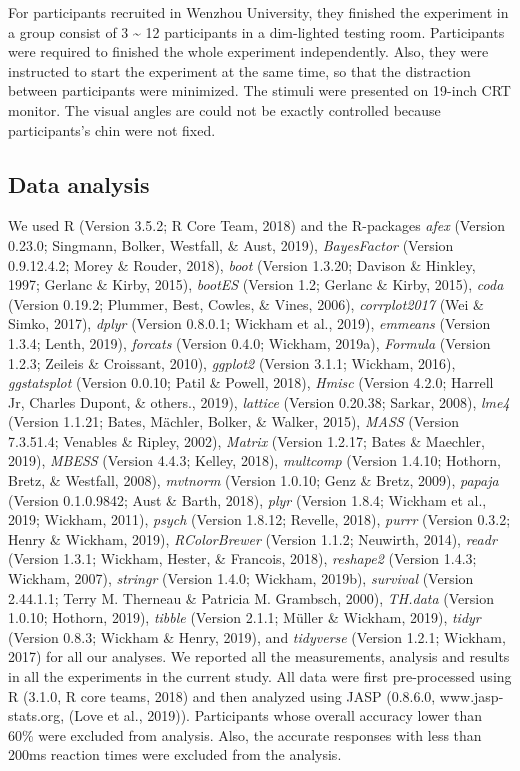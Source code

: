 \documentclass[man]{apa6}
\begin{document}
For participants recruited in Wenzhou University, they finished the experiment in a group consist of 3 \textasciitilde{} 12 participants in a dim-lighted testing room. Participants were required to finished the whole experiment independently. Also, they were instructed to start the experiment at the same time, so that the distraction between participants were minimized. The stimuli were presented on 19-inch CRT monitor. The visual angles are could not be exactly controlled because participants's chin were not fixed.

\hypertarget{data-analysis}{%
\subsection{Data analysis}\label{data-analysis}}

We used R (Version 3.5.2; R Core Team, 2018) and the R-packages \emph{afex} (Version 0.23.0; Singmann, Bolker, Westfall, \& Aust, 2019), \emph{BayesFactor} (Version 0.9.12.4.2; Morey \& Rouder, 2018), \emph{boot} (Version 1.3.20; Davison \& Hinkley, 1997; Gerlanc \& Kirby, 2015), \emph{bootES} (Version 1.2; Gerlanc \& Kirby, 2015), \emph{coda} (Version 0.19.2; Plummer, Best, Cowles, \& Vines, 2006), \emph{corrplot2017} (Wei \& Simko, 2017), \emph{dplyr} (Version 0.8.0.1; Wickham et al., 2019), \emph{emmeans} (Version 1.3.4; Lenth, 2019), \emph{forcats} (Version 0.4.0; Wickham, 2019a), \emph{Formula} (Version 1.2.3; Zeileis \& Croissant, 2010), \emph{ggplot2} (Version 3.1.1; Wickham, 2016), \emph{ggstatsplot} (Version 0.0.10; Patil \& Powell, 2018), \emph{Hmisc} (Version 4.2.0; Harrell Jr, Charles Dupont, \& others., 2019), \emph{lattice} (Version 0.20.38; Sarkar, 2008), \emph{lme4} (Version 1.1.21; Bates, Mächler, Bolker, \& Walker, 2015), \emph{MASS} (Version 7.3.51.4; Venables \& Ripley, 2002), \emph{Matrix} (Version 1.2.17; Bates \& Maechler, 2019), \emph{MBESS} (Version 4.4.3; Kelley, 2018), \emph{multcomp} (Version 1.4.10; Hothorn, Bretz, \& Westfall, 2008), \emph{mvtnorm} (Version 1.0.10; Genz \& Bretz, 2009), \emph{papaja} (Version 0.1.0.9842; Aust \& Barth, 2018), \emph{plyr} (Version 1.8.4; Wickham et al., 2019; Wickham, 2011), \emph{psych} (Version 1.8.12; Revelle, 2018), \emph{purrr} (Version 0.3.2; Henry \& Wickham, 2019), \emph{RColorBrewer} (Version 1.1.2; Neuwirth, 2014), \emph{readr} (Version 1.3.1; Wickham, Hester, \& Francois, 2018), \emph{reshape2} (Version 1.4.3; Wickham, 2007), \emph{stringr} (Version 1.4.0; Wickham, 2019b), \emph{survival} (Version 2.44.1.1; Terry M. Therneau \& Patricia M. Grambsch, 2000), \emph{TH.data} (Version 1.0.10; Hothorn, 2019), \emph{tibble} (Version 2.1.1; Müller \& Wickham, 2019), \emph{tidyr} (Version 0.8.3; Wickham \& Henry, 2019), and \emph{tidyverse} (Version 1.2.1; Wickham, 2017) for all our analyses.
We reported all the measurements, analysis and results in all the experiments in the current study. All data were first pre-processed using R (3.1.0, R core teams, 2018) and then analyzed using JASP (0.8.6.0, www.jasp-stats.org, (Love et al., 2019)). Participants whose overall accuracy lower than 60\% were excluded from analysis. Also, the accurate responses with less than 200ms reaction times were excluded from the analysis.
\end{document}
